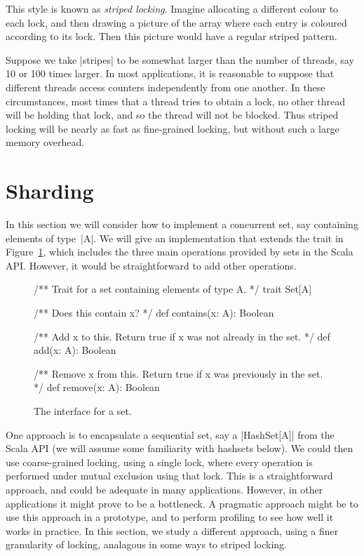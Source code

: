 
This style is known as \emph{striped locking}.  Imagine allocating a different
colour to each lock, and then drawing a picture of the array where each entry
is coloured according to its lock.  Then this picture would have a regular
striped pattern. 

Suppose we take |stripes| to be somewhat larger than the number of threads,
say 10 or 100 times larger.  In most applications, it is reasonable to suppose
that different threads access counters independently from one another.  In
these circumstances, most times that a thread tries to obtain a lock, no other
thread will be holding that lock, and so the thread will not be blocked.  Thus
striped locking will be nearly as fast as fine-grained locking, but without
such a large memory overhead.  


\section{Sharding}
\label{sec:sharding}

In this section we will consider how to implement a concurrent set, say
containing elements of type~|A|.  We will give an implementation that extends
the trait in Figure~\ref{fig:Set-trait}, which includes the three main
operations provided by sets in the Scala API.  However, it would be
straightforward to add other operations.


\begin{figure}
\begin{scala}
/** Trait for a set containing elements of type A. */
trait Set[A]{
  /** Does this contain x? */
  def contains(x: A): Boolean

  /** Add x to this.  Return true if x was not already in the set. */
  def add(x: A): Boolean 

  /** Remove x from this.  Return true if x was previously in the set. */
  def remove(x: A): Boolean
}
\end{scala}
\caption{The interface for a set.}
\label{fig:Set-trait}
\end{figure}


One approach is to encapsulate a sequential set, say a |HashSet[A]| from the
Scala API (we will assume some familiarity with hashsets below).  We could
then use coarse-grained locking, using a single lock, where every operation is
performed under mutual exclusion using that lock.  This is a straightforward
approach, and could be adequate in many applications.  However, in other
applications it might prove to be a bottleneck.  A pragmatic approach might be
to use this approach in a prototype, and to perform profiling to see how well
it works in practice.  In this section, we study a different approach, using a
finer granularity of locking, analagous in some ways to striped locking.

